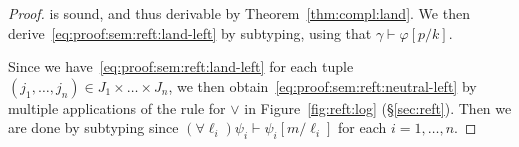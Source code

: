 \documentclass[%
  a4paper,
  UKenglish,
  cleveref,
  autoref,
  thm-restate,
  numberwithinsect,
]{lipics-v2021}
\newcommand\thesis{\vdash}
\newcommand\itvar{k}
\newcommand\itvarbis{\ell}
\begin{document}
\begin{proof}
\noindent
is sound, and thus derivable by Theorem~\ref{thm:compl:land}.
We then derive~\eqref{eq:proof:sem:reft:land-left}
by subtyping,
using that $\gamma \thesis \varphi[p / \itvar]$.

Since we have~\eqref{eq:proof:sem:reft:land-left}
for each tuple $(j_1,\dots,j_n) \in J_1 \times \dots \times J_n$,
we then obtain~\eqref{eq:proof:sem:reft:neutral-left}
by multiple applications
of the rule for $\lor$ in Figure~\ref{fig:reft:log} (\S\ref{sec:reft}).
Then we are done by subtyping since
$(\forall \itvarbis_i)\psi_i \thesis \psi_i[m / \itvarbis_i]$
for each $i = 1,\dots,n$.
\end{proof}









\end{document}
